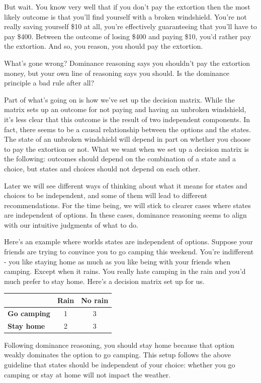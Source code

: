 \documentclass[]{tufte-book}
\begin{document}
But wait. You know very well that if you don't pay the extortion then the most likely outcome is that you'll find yourself with a broken windshield. You're not really saving yourself \$10 at all, you're effectively guaranteeing that you'll have to pay \$400. Between the outcome of losing \$400 and paying \$10, you'd rather pay the extortion. And so, you reason, you should pay the extortion.

What's gone wrong? Dominance reasoning says you shouldn't pay the extortion money, but your own line of reasoning says you should. Is the dominance principle a bad rule after all?

Part of what's going on is how we've set up the decision matrix. While the matrix sets up an outcome for not paying and having an unbroken windshield, it's less clear that this outcome is the result of two independent components. In fact, there seems to be a causal relationship between the options and the states. The state of an unbroken windshield will depend in part on whether you choose to pay the extortion or not. What we want when we set up a decision matrix is the following: outcomes should depend on the combination of a state and a choice, but states and choices should not depend on each other.

Later we will see different ways of thinking about what it means for states and choices to be independent, and some of them will lead to different recommendations. For the time being, we will stick to clearer cases where states are independent of options. In these cases, dominance reasoning seems to align with our intuitive judgments of what to do.

Here's an example where worlds states are independent of options. Suppose your friends are trying to convince you to go camping this weekend. You're indifferent - you like staying home as much as you like being with your friends when camping. Except when it rains. You really hate camping in the rain and you'd much prefer to stay home. Here's a decision matrix set up for us.

\begin{longtable}[]{@{}lcc@{}}
\toprule
& Rain & No rain\tabularnewline
\midrule
\endhead
\textbf{Go camping} & 1 & 3\tabularnewline
\textbf{Stay home} & 2 & 3\tabularnewline
\bottomrule
\end{longtable}

Following dominance reasoning, you should stay home because that option weakly dominates the option to go camping. This setup follows the above guideline that states should be independent of your choice: whether you go camping or stay at home will not impact the weather.
\end{document}
